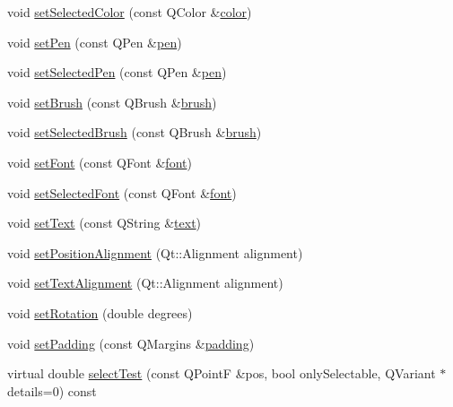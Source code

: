 \begin{DoxyCompactItemize}
\item 
void \hyperlink{class_q_c_p_item_text_ae7ba0bdb75c897b028388e45bfd435fa}{set\-Selected\-Color} (const Q\-Color \&\hyperlink{class_q_c_p_item_text_ac9cb0a8a27f64d1b40855910ea9ebd03}{color})
\item 
void \hyperlink{class_q_c_p_item_text_a9b9ec6eea0eb0603977ff84d4c78d0a3}{set\-Pen} (const Q\-Pen \&\hyperlink{class_q_c_p_item_text_a552bd02f46dbcb4b4812559036893352}{pen})
\item 
void \hyperlink{class_q_c_p_item_text_a291febe586f0da3f1c392e77bef4aa20}{set\-Selected\-Pen} (const Q\-Pen \&\hyperlink{class_q_c_p_item_text_a552bd02f46dbcb4b4812559036893352}{pen})
\item 
void \hyperlink{class_q_c_p_item_text_a1c7e131516df2ed8d941ef31240ded8e}{set\-Brush} (const Q\-Brush \&\hyperlink{class_q_c_p_item_text_a38b981dfacb703efa8e27346eebcb5a2}{brush})
\item 
void \hyperlink{class_q_c_p_item_text_a6b8377eeb2af75eb9528422671ac16cb}{set\-Selected\-Brush} (const Q\-Brush \&\hyperlink{class_q_c_p_item_text_a38b981dfacb703efa8e27346eebcb5a2}{brush})
\item 
void \hyperlink{class_q_c_p_item_text_a94ad60ebe04f5c07c35e7c2029e96b1f}{set\-Font} (const Q\-Font \&\hyperlink{class_q_c_p_item_text_ad34943fd68a9b1451d3e3234d072e418}{font})
\item 
void \hyperlink{class_q_c_p_item_text_a0be2841772f83663c4db307928b82816}{set\-Selected\-Font} (const Q\-Font \&\hyperlink{class_q_c_p_item_text_ad34943fd68a9b1451d3e3234d072e418}{font})
\item 
void \hyperlink{class_q_c_p_item_text_a3dacdda0ac88f99a05b333b977c48747}{set\-Text} (const Q\-String \&\hyperlink{class_q_c_p_item_text_a9547f7832010486abed0837e75db5330}{text})
\item 
void \hyperlink{class_q_c_p_item_text_a781cdf8c640fc6a055dcff1e675c8c7a}{set\-Position\-Alignment} (Qt\-::\-Alignment alignment)
\item 
void \hyperlink{class_q_c_p_item_text_ab5bc0684c4d1bed81949a11b34dba478}{set\-Text\-Alignment} (Qt\-::\-Alignment alignment)
\item 
void \hyperlink{class_q_c_p_item_text_a4bcc10cd97952c3f749d75824b5077f0}{set\-Rotation} (double degrees)
\item 
void \hyperlink{class_q_c_p_item_text_aeea8a3e01f135f9dd0bb08f51db66310}{set\-Padding} (const Q\-Margins \&\hyperlink{class_q_c_p_item_text_a00e0fa03822ff384bf4921c1c90322ff}{padding})
\item 
virtual double \hyperlink{class_q_c_p_item_text_a285b95bb6634c2e4f7768abb7a8bc69c}{select\-Test} (const Q\-Point\-F \&pos, bool only\-Selectable, Q\-Variant $\ast$details=0) const 
\end{DoxyCompactItemize}
